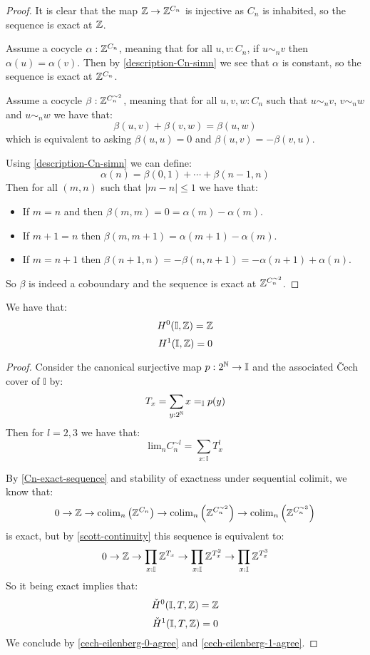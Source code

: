 \begin{proof}
It is clear that the map $\mathbb{Z}\to \mathbb{Z}^{C_n}$ is injective as $C_n$ is inhabited, so the sequence is exact at $\mathbb{Z}$.

Assume a cocycle $\alpha:\mathbb{Z}^{C_n}$, meaning that for all $u,v:C_n$, if $u\sim_nv$ then $\alpha(u)=\alpha(v)$. Then by \cref{description-Cn-simn} we see that $\alpha$ is constant, so the sequence is exact at $\mathbb{Z}^{C_n}$.

Assume a cocycle $\beta:\mathbb{Z}^{C_n^{\sim2}}$, meaning that for all $u,v,w:C_n$ such that $u\sim_nv$, $v\sim_nw$ and $u\sim_nw$ we have that:
\[\beta(u,v)+\beta(v,w) = \beta(u,w)\]
which is equivalent to asking $\beta(u,u)=0$ and $\beta(u,v) = -\beta(v,u)$.

Using \cref{description-Cn-simn} we can define: 
\[\alpha(n) = \beta(0,1)+\cdots+\beta(n-1,n)\]
Then for all $(m,n)$ such that $|m-n|\leq 1$ we have that:
\begin{itemize} 
\item If $m=n$ and then $\beta(m,m) = 0 = \alpha(m)-\alpha(m)$.
\item If $m+1=n$ then $\beta(m,m+1) = \alpha(m+1)-\alpha(m)$.
\item If $m=n+1$ then $\beta(n+1,n) = - \beta(n,n+1) = -\alpha(n+1)+\alpha(n)$.
\end{itemize}
So $\beta$ is indeed a coboundary and the sequence is exact at $\mathbb{Z}^{C_n^{\sim2}}$.
\end{proof}

\begin{proposition}\label{cohomology-I}
We have that:
\[H^0(\mathbb{I},\mathbb{Z}) = \mathbb{Z}\]
\[H^1(\mathbb{I},\mathbb{Z}) = 0\]
\end{proposition}

\begin{proof}
Consider the canonical surjective map $p:2^{\mathbb{N}}\to\mathbb{I}$ and the associated \v{C}ech cover of $\mathbb{I}$ by: 
\[T_x = \sum_{y:2^{\mathbb{N}}} x=_\mathbb{I} p(y)\]
Then for $l=2,3$ we have that:
\[\mathrm{lim}_nC_n^{\sim l} = \sum_{x:\mathbb{I}} T_x^l\]

By \cref{Cn-exact-sequence} and stability of exactness under sequential colimit, we know that:
\[ 0\to \mathbb{Z}\to \mathrm{colim}_n \left(\mathbb{Z}^{C_n}\right) \to \mathrm{colim}_n \left(\mathbb{Z}^{C_n^{\sim2}}\right)\to \mathrm{colim}_n \left(\mathbb{Z}^{C_n^{\sim3}}\right)\]
is exact, but by \cref{scott-continuity} this sequence is equivalent to:
\[ 0\to \mathbb{Z}\to \prod_{x:\mathbb{I}}\mathbb{Z}^{T_x} \to  \prod_{x:\mathbb{I}}\mathbb{Z}^{T_x^2} \to  \prod_{x:\mathbb{I}}\mathbb{Z}^{T_x^3}\]
So it being exact implies that:
\[\check{H}^0(\mathbb{I},T,\mathbb{Z}) = \mathbb{Z}\]
\[\check{H}^1(\mathbb{I},T,\mathbb{Z}) = 0\]
We conclude by \cref{cech-eilenberg-0-agree} and \cref{cech-eilenberg-1-agree}.
\end{proof}

